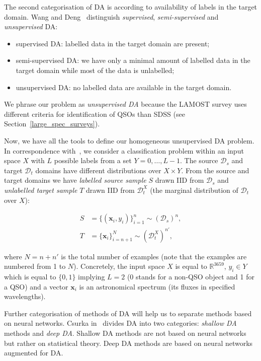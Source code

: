 The second categorisation of DA is according to availability of labels in the target domain.
Wang and Deng~\cite{wang2018} distinguish \textit{supervised}, \textit{semi-supervised} and \textit{unsupervised} DA:

\begin{itemize}
	\item supervised DA: labelled data in the target domain are present;
	\item semi-supervised DA: we have only a minimal amount of labelled data in the target domain while most of the data is unlabelled;
	\item unsupervised DA: no labelled data are available in the target domain.
\end{itemize}

We phrase our problem as \textit{unsupervised DA}
because the LAMOST survey uses different criteria for identification of QSOs than SDSS
(see Section~\ref{large_spec_surveys}).

Now, we have all the tools to define our homogeneous unsupervised DA problem.
In correspondence with~\cite{ganin2016},
we consider a classification problem within an input space \(X\)
with \(L\) possible labels from a set \(Y = {0, \dots, L - 1}\).
The source \(\mathcal{D}_s\) and target \(\mathcal{D}_t\) domains
have different distributions over \(X \times Y\).
From the source and target domains
we have \textit{labelled source sample} \(S\) drawn IID from \(\mathcal{D}_s\)
and \textit{unlabelled target sample} \(T\) drawn IID from \(\mathcal{D}^X_t\) 
(the marginal distribution of \(\mathcal{D}_t\) over \(X\)):

\begin{align}
	S &= \{(\mathbf{x}_i, y_i)\}^n_{i = 1} \sim (\mathcal{D}_s)^n, \\
	T &= \{\mathbf{x}_i\}^N_{i = n + 1} \sim (\mathcal{D}^X_t)^{n'},
\end{align}

where \(N = n + n'\) is the total number of examples
(note that the examples are numbered from 1 to \(N\)).
Concretely, the input space \(X\) is equal to \(\mathbb{R}^{3659}\),
\(y_i \in Y\) which is equal to \(\{0, 1\}\) implying \(L = 2\)
(0 stands for a non-QSO object and 1 for a QSO)
and a vector \(\mathbf{x}_i\) is an astronomical spectrum
(its fluxes in specified wavelengths).

Further categorisation of methods of DA will help us to separate methods based on neural networks.
Csurka in~\cite{csurka2017} divides DA into two categories:
\textit{shallow DA} methods and \textit{deep DA}.
Shallow DA methods are not based on neural networks but rather on statistical theory.
Deep DA methods are based on neural networks augmented for DA.

